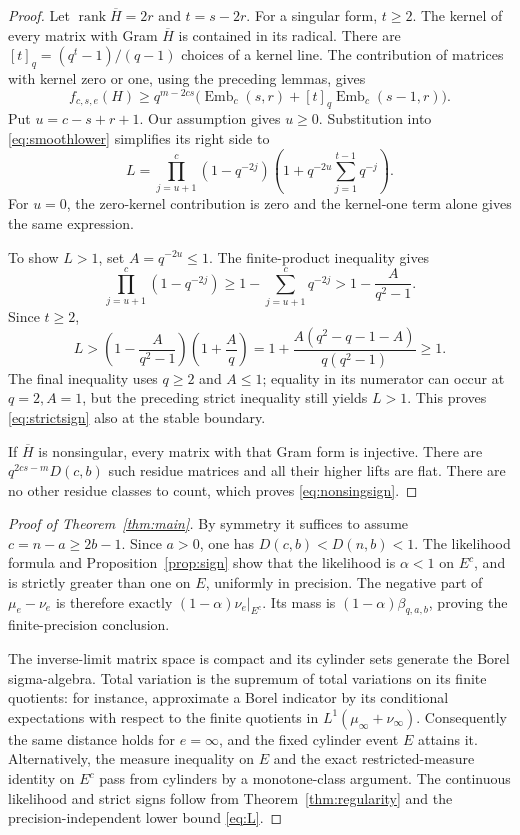\documentclass[11pt]{article}
\theoremstyle{remark}
\newcommand{\rank}{\operatorname{rank}}
\newcommand{\Emb}{\operatorname{Emb}}
\begin{document}
\begin{proof}
Let \(\rank\overline H=2r\) and \(t=s-2r\). For a singular form,
\(t\ge2\). The kernel of every matrix with Gram \(\overline H\)
is contained in its radical. There are
\([t]_q=(q^t-1)/(q-1)\) choices of a kernel line.
The contribution of matrices with kernel zero or one, using the preceding
lemmas, gives
\[
 f_{c,s,e}(H)\ge
 q^{m-2cs}\bigl(\Emb_c(s,r)+[t]_q\Emb_c(s-1,r)\bigr).
 \tag{4.3}\label{eq:smoothlower}
\]
Put \(u=c-s+r+1\). Our assumption gives \(u\ge0\).
Substitution into \eqref{eq:smoothlower} simplifies its right side to
\[
 L=
 \prod_{j=u+1}^{c}(1-q^{-2j})
 \left(1+q^{-2u}\sum_{j=1}^{t-1}q^{-j}\right).
 \tag{4.4}\label{eq:L}
\]
For \(u=0\), the zero-kernel contribution is zero and the kernel-one
term alone gives the same expression.

To show \(L>1\), set \(A=q^{-2u}\le1\). The finite-product inequality gives
\[
 \prod_{j=u+1}^{c}(1-q^{-2j})
 \ge1-\sum_{j=u+1}^{c}q^{-2j}
 >1-\frac{A}{q^2-1}.
\]
Since \(t\ge2\),
\[
 L>
 \left(1-\frac{A}{q^2-1}\right)\left(1+\frac A q\right)
 =1+\frac{A(q^2-q-1-A)}{q(q^2-1)}\ge1.
 \tag{4.5}\label{eq:Lpositive}
\]
The final inequality uses \(q\ge2\) and \(A\le1\); equality in its numerator
can occur at \(q=2,A=1\), but the preceding strict inequality still yields
\(L>1\). This proves \eqref{eq:strictsign} also at the stable boundary.

If \(\overline H\) is nonsingular, every matrix with that Gram form is
injective. There are \(q^{2cs-m}D(c,b)\) such residue matrices and all
their higher lifts are flat. There are no other residue classes to count,
which proves \eqref{eq:nonsingsign}.
\end{proof}

\begin{proof}[Proof of Theorem~\ref{thm:main}]
By symmetry it suffices to assume \(c=n-a\ge2b-1\).
Since \(a>0\), one has \(D(c,b)<D(n,b)<1\).
The likelihood formula and Proposition~\ref{prop:sign} show that the
likelihood is \(\alpha<1\) on \(E^c\), and is strictly greater than one
on \(E\), uniformly in precision. The negative part of
\(\mu_e-\nu_e\) is therefore exactly
\((1-\alpha)\nu_e|_{E^c}\). Its mass is
\((1-\alpha)\beta_{q,a,b}\), proving the finite-precision conclusion.

The inverse-limit matrix space is compact and its cylinder sets generate
the Borel sigma-algebra. Total variation is the supremum of total
variations on its finite quotients: for instance, approximate a Borel
indicator by its conditional expectations with respect to the finite
quotients in \(L^1(\mu_\infty+\nu_\infty)\). Consequently the same
distance holds for \(e=\infty\), and the fixed cylinder event \(E\)
attains it. Alternatively, the measure inequality on \(E\) and the
exact restricted-measure identity on \(E^c\) pass from cylinders by a
monotone-class argument. The continuous likelihood and strict signs
follow from Theorem~\ref{thm:regularity} and the
precision-independent lower bound \eqref{eq:L}.
\end{proof}
\end{document}
